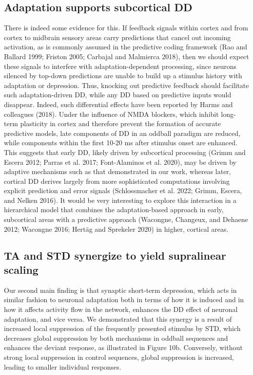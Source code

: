 \documentclass[pdflatex,referee,iicol,sn-basic]{sn-jnl}
\begin{document}
\subsection{Adaptation supports subcortical DD}

There is indeed some evidence for this. If feedback signals within cortex and from cortex to midbrain sensory areas carry predictions that cancel out incoming activation, as is commonly assumed in the predictive coding framework (Rao and Ballard 1999; Friston 2005; Carbajal and Malmierca 2018), then we should expect these signals to interfere with adaptation-dependent processing, since neurons silenced by top-down predictions are unable to build up a stimulus history with adaptation or depression. Thus, knocking out predictive feedback should facilitate such adaptation-driven DD, while any DD based on predictive inputs would disappear. Indeed, such differential effects have been reported by Harms and colleagues (2018). Under the influence of NMDA blockers, which inhibit long-term plasticity in cortex and therefore prevent the formation of accurate predictive models, late components of DD in an oddball paradigm are reduced, while components within the first 10-20 ms after stimulus onset are enhanced. This suggests that early DD, likely driven by subcortical processing (Grimm and Escera 2012; Parras et al. 2017; Font-Alaminos et al. 2020), may be driven by adaptive mechanisms such as that demonstrated in our work, whereas later, cortical DD derives largely from more sophisticated computations involving explicit prediction and error signals (Schlossmacher et al. 2022; Grimm, Escera, and Nelken 2016). It would be very interesting to explore this interaction in a hierarchical model that combines the adaptation-based approach in early, subcortical areas with a predictive approach (Wacongne, Changeux, and Dehaene 2012; Wacongne 2016; Hertäg and Sprekeler 2020) in higher, cortical areas. 

\subsection{TA and STD synergize to yield supralinear scaling}

Our second main finding is that synaptic short-term depression, which acts in similar fashion to neuronal adaptation both in terms of how it is induced and in how it affects activity flow in the network, enhances the DD effect of neuronal adaptation, and vice versa. We demonstrated that this synergy is a result of increased local suppression of the frequently presented stimulus by STD, which decreases global suppression by both mechanisms in oddball sequences and enhances the deviant response, as illustrated in Figure 10b. Conversely, without strong local suppression in control sequences, global suppression is increased, leading to smaller individual responses.
\end{document}
